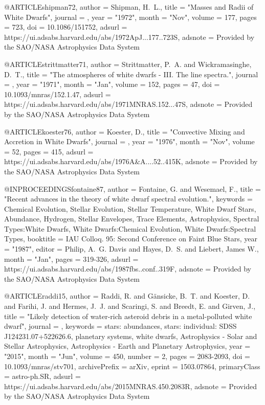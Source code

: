 \documentclass[a4paper,fleqn,usenatbib]{mnras}
\begin{document}
@ARTICLE{shipman72,
       author = {{Shipman}, H.~L.},
        title = "{Masses and Radii of White Dwarfs}",
      journal = {\apj},
         year = "1972",
        month = "Nov",
       volume = {177},
        pages = {723},
          doi = {10.1086/151752},
       adsurl = {https://ui.adsabs.harvard.edu/abs/1972ApJ...177..723S},
      adsnote = {Provided by the SAO/NASA Astrophysics Data System}
}



@ARTICLE{strittmatter71,
       author = {{Strittmatter}, P.~A. and {Wickramasinghe}, D.~T.},
        title = "{The atmospheres of white dwarfs - III. The line spectra.}",
      journal = {\mnras},
         year = "1971",
        month = "Jan",
       volume = {152},
        pages = {47},
          doi = {10.1093/mnras/152.1.47},
       adsurl = {https://ui.adsabs.harvard.edu/abs/1971MNRAS.152...47S},
      adsnote = {Provided by the SAO/NASA Astrophysics Data System}
}

@ARTICLE{koester76,
       author = {{Koester}, D.},
        title = "{Convective Mixing and Accretion in White Dwarfs}",
      journal = {\aap},
         year = "1976",
        month = "Nov",
       volume = {52},
        pages = {415},
       adsurl = {https://ui.adsabs.harvard.edu/abs/1976A&A....52..415K},
      adsnote = {Provided by the SAO/NASA Astrophysics Data System}
}



@INPROCEEDINGS{fontaine87,
       author = {{Fontaine}, G. and {Wesemael}, F.},
        title = "{Recent advances in the theory of white dwarf spectral evolution.}",
     keywords = {Chemical Evolution, Stellar Evolution, Stellar Temperature, White Dwarf Stars, Abundance, Hydrogen, Stellar Envelopes, Trace Elements, Astrophysics, Spectral Types:White Dwarfs, White Dwarfs:Chemical Evolution, White Dwarfs:Spectral Types},
    booktitle = {IAU Colloq. 95: Second Conference on Faint Blue Stars},
         year = "1987",
       editor = {{Philip}, A.~G. Davis and {Hayes}, D.~S. and {Liebert}, James W.},
        month = "Jan",
        pages = {319-326},
       adsurl = {https://ui.adsabs.harvard.edu/abs/1987fbs..conf..319F},
      adsnote = {Provided by the SAO/NASA Astrophysics Data System}
}



@ARTICLE{raddi15,
       author = {{Raddi}, R. and {G{\"a}nsicke}, B.~T. and {Koester}, D. and
         {Farihi}, J. and {Hermes}, J.~J. and {Scaringi}, S. and {Breedt}, E. and
         {Girven}, J.},
        title = "{Likely detection of water-rich asteroid debris in a metal-polluted white dwarf}",
      journal = {\mnras},
     keywords = {stars: abundances, stars: individual: SDSS J124231.07+522626.6, planetary systems, white dwarfs, Astrophysics - Solar and Stellar Astrophysics, Astrophysics - Earth and Planetary Astrophysics},
         year = "2015",
        month = "Jun",
       volume = {450},
       number = {2},
        pages = {2083-2093},
          doi = {10.1093/mnras/stv701},
archivePrefix = {arXiv},
       eprint = {1503.07864},
 primaryClass = {astro-ph.SR},
       adsurl = {https://ui.adsabs.harvard.edu/abs/2015MNRAS.450.2083R},
      adsnote = {Provided by the SAO/NASA Astrophysics Data System}
}
\end{document}
